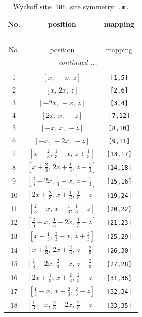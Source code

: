 \documentclass[fleqn,8pt]{jsarticle}
\begin{document}
\renewcommand{\arraystretch}{1.2}
\begin{longtable}{ccc}
\caption{Wyckoff site: {\tt 18h}, site symmetry: {\tt .m.}}
 \\
 \hline \hline
No. & position & mapping \\ \hline \endfirsthead

\multicolumn{2}{l}{\tablename\ \thetable{}} \\
 \hline \hline
No. & position & mapping \\ \hline \endhead

 \hline \hline
\multicolumn{2}{r}{\footnotesize\it continued ...} \\ \endfoot

 \hline \hline
\multicolumn{2}{r}{} \\ \endlastfoot

1 & $\left[ x,\, - x,\, z \right]$ & {\tt [1,5]} \\ \hline
2 & $\left[ x,\, 2 x,\, z \right]$ & {\tt [2,6]} \\ \hline
3 & $\left[ - 2 x,\, - x,\, z \right]$ & {\tt [3,4]} \\ \hline
4 & $\left[ 2 x,\, x,\, - z \right]$ & {\tt [7,12]} \\ \hline
5 & $\left[ - x,\, x,\, - z \right]$ & {\tt [8,10]} \\ \hline
6 & $\left[ - x,\, - 2 x,\, - z \right]$ & {\tt [9,11]} \\ \hline
7 & $\left[ x + \frac{2}{3},\, \frac{1}{3} - x,\, z + \frac{1}{3} \right]$ & {\tt [13,17]} \\ \hline
8 & $\left[ x + \frac{2}{3},\, 2 x + \frac{1}{3},\, z + \frac{1}{3} \right]$ & {\tt [14,18]} \\ \hline
9 & $\left[ \frac{2}{3} - 2 x,\, \frac{1}{3} - x,\, z + \frac{1}{3} \right]$ & {\tt [15,16]} \\ \hline
10 & $\left[ 2 x + \frac{2}{3},\, x + \frac{1}{3},\, \frac{1}{3} - z \right]$ & {\tt [19,24]} \\ \hline
11 & $\left[ \frac{2}{3} - x,\, x + \frac{1}{3},\, \frac{1}{3} - z \right]$ & {\tt [20,22]} \\ \hline
12 & $\left[ \frac{2}{3} - x,\, \frac{1}{3} - 2 x,\, \frac{1}{3} - z \right]$ & {\tt [21,23]} \\ \hline
13 & $\left[ x + \frac{1}{3},\, \frac{2}{3} - x,\, z + \frac{2}{3} \right]$ & {\tt [25,29]} \\ \hline
14 & $\left[ x + \frac{1}{3},\, 2 x + \frac{2}{3},\, z + \frac{2}{3} \right]$ & {\tt [26,30]} \\ \hline
15 & $\left[ \frac{1}{3} - 2 x,\, \frac{2}{3} - x,\, z + \frac{2}{3} \right]$ & {\tt [27,28]} \\ \hline
16 & $\left[ 2 x + \frac{1}{3},\, x + \frac{2}{3},\, \frac{2}{3} - z \right]$ & {\tt [31,36]} \\ \hline
17 & $\left[ \frac{1}{3} - x,\, x + \frac{2}{3},\, \frac{2}{3} - z \right]$ & {\tt [32,34]} \\ \hline
18 & $\left[ \frac{1}{3} - x,\, \frac{2}{3} - 2 x,\, \frac{2}{3} - z \right]$ & {\tt [33,35]} \\
\end{longtable}
\end{document}
